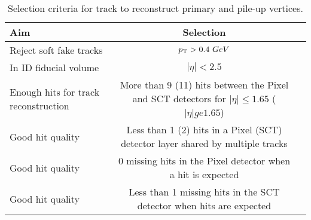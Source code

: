 \begin{table}[tbh]
\centering
\tiny

\begin{tabular}{|l|c|c}

\hline
 Aim& Selection \\
\hline
Reject soft fake tracks &$p_{\mathrm{T}}> 0.4~GeV$ \\
\hline
In ID fiducial volume &$|\eta| < 2.5$ \\
\hline 
Enough hits for track reconstruction & More than 9 (11) hits between the Pixel and SCT detectors for $|\eta|\le 1.65$ ($|\eta| ge 1.65$)\\
\hline 
 Good hit quality& Less than 1 (2) hits in a Pixel (SCT) detector layer shared by multiple tracks\\
\hline
 Good hit quality&0 missing hits in the Pixel detector when a hit is expected\\
\hline 
Good hit quality&Less than 1 missing hits in the SCT detector when hits are expected\\
 \hline
\end{tabular}
\caption{Selection criteria for track to reconstruct primary and pile-up vertices.}
\label{tab:pv}

\end{table}


